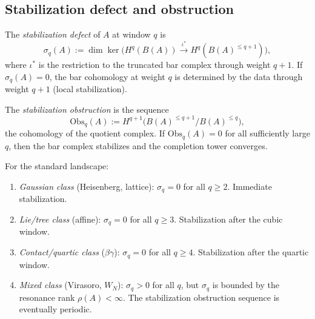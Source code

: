 \subsection{Stabilization defect and obstruction}

\begin{definition}
The \emph{stabilization defect} of $A$ at window $q$ is
\begin{equation}%
\sigma_q(A)
:=
\dim\ker\bigl(H^q(B(A)) \xrightarrow{\iota^*}
H^q(B(A)^{\le q+1})\bigr),
\end{equation}
where $\iota^*$ is the restriction to the truncated bar complex through
weight $q+1$. If $\sigma_q(A) = 0$, the bar cohomology at weight $q$
is determined by the data through weight $q+1$ (local stabilization).
\end{definition}

\begin{definition}
The \emph{stabilization obstruction} is the sequence
\begin{equation}%
\mathrm{Obs}_q(A)
:=
H^{q+1}\bigl(B(A)^{\le q+1} / B(A)^{\le q}\bigr),
\end{equation}
the cohomology of the quotient complex. If
$\mathrm{Obs}_q(A) = 0$ for all sufficiently large $q$, then the
bar complex stabilizes and the completion tower converges.
\end{definition}

\begin{proposition}
For the standard landscape:
\begin{enumerate}[leftmargin=2.4em]
\item \emph{Gaussian class} (Heisenberg, lattice):
$\sigma_q = 0$ for all $q \ge 2$. Immediate stabilization.

\item \emph{Lie/tree class} (affine):
$\sigma_q = 0$ for all $q \ge 3$. Stabilization after the cubic window.

\item \emph{Contact/quartic class} ($\beta\gamma$):
$\sigma_q = 0$ for all $q \ge 4$. Stabilization after the quartic window.

\item \emph{Mixed class} (Virasoro, $W_N$):
$\sigma_q > 0$ for all $q$, but $\sigma_q$ is bounded by the resonance
rank $\rho(A) < \infty$. The stabilization obstruction sequence is
eventually periodic.
\end{enumerate}
\end{proposition}

